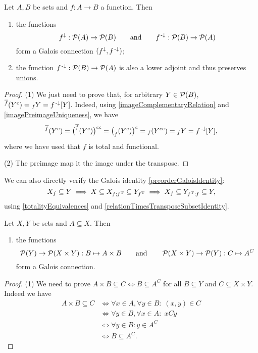 \begin{corollary} \label{functionImagePreimageGaloisConnection}
Let $A,B$ be sets and $f:A\to B$ a function. Then
\begin{enumerate}
\item the functions
\[ f^\downarrow: \operatorname{\mathcal{P}}(A)\to\operatorname{\mathcal{P}}(B) \qquad\text{and}\qquad f^{\text{\hspace{0.15em}-}\downarrow}: \operatorname{\mathcal{P}}(B)\to\operatorname{\mathcal{P}}(A) \]
form a Galois connection $(f^\downarrow, f^{\text{\hspace{0.15em}-}\downarrow})$;
\item the function $f^{\text{\hspace{0.15em}-}\downarrow}: \operatorname{\mathcal{P}}(B)\to\operatorname{\mathcal{P}}(A)$ is also a lower adjoint and thus preserves unions.
\end{enumerate}
\end{corollary}
\begin{proof}
(1) We just need to prove that, for arbitrary $Y\in \operatorname{\mathcal{P}}(B)$, ${^{\overline{f}}(Y^c)} = {_fY} = f^{\text{\hspace{0.15em}-}\downarrow}[Y]$. Indeed, using \ref{imageComplementaryRelation} and \ref{imagePreimageUniqueness}, we have
\[ {^{\overline{f}}(Y^c)} = \big(^{\overline{f}}(Y^c)\big)^{cc} = \big(_f(Y^c)\big)^c = {_f(Y^{cc})} = {_fY} = f^{\text{\hspace{0.15em}-}\downarrow}[Y], \]
where we have used that $f$ is total and functional.

(2) The preimage map it the image under the transpose.
\end{proof}
We can also directly verify the Galois identity \ref{preorderGaloisIdentity}:
\[ X_f \subseteq Y \implies X \subseteq X_{f;f^{\mathrm{T}}} \subseteq Y_{f^{\mathrm{T}}} \implies X_f \subseteq Y_{f^{\mathrm{T}};f} \subseteq Y, \]
using \ref{totalityEquivalences} and \ref{relationTimesTransposeSubsetIdentity}.

\begin{proposition} \label{productGaloisConnections}
Let $X,Y$ be sets and $A\subseteq X$. Then
\begin{enumerate}
\item the functions
\[ \operatorname{\mathcal{P}}(Y)\to \operatorname{\mathcal{P}}(X\times Y): B \mapsto A\times B \qquad\text{and}\qquad \operatorname{\mathcal{P}}(X\times Y)\to \operatorname{\mathcal{P}}(Y): C\mapsto A^C \]
form a Galois connection.
\end{enumerate}
\end{proposition}
\begin{proof}
(1) We need to prove $A\times B \subseteq C \iff B\subseteq A^C$ for all $B\subseteq Y$ and $C\subseteq X\times Y$. Indeed we have
\begin{align*}
A\times B \subseteq C &\iff \forall x\in A, \forall y\in B: \; (x,y)\in C \\
&\iff \forall y\in B, \forall x\in A: \; xCy \\
&\iff \forall y\in B: y\in A^C \\
&\iff B \subseteq A^C.
\end{align*}
\end{proof}

